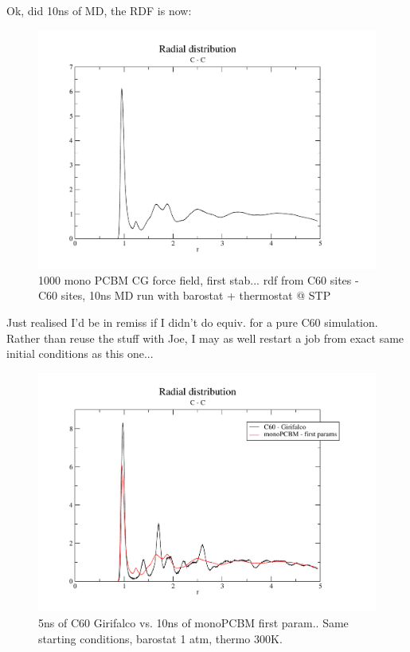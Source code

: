 \documentclass[hyperref]{labbook}
\begin{document}
Ok, did 10ns of MD, the RDF is now:

\begin{figure}[h!]
\centering
\includegraphics[width=0.8\columnwidth,angle=270]{./figs/monoPCBM-CG_1000_rdf_10ns}
\caption{\label{monoPCBM-CG_1000_rdf_10ns}
1000 mono PCBM CG force field, first stab... rdf from C60 sites - C60 sites, 10ns MD run with barostat + thermostat @ STP
}
\end{figure}

Just realised I'd be in remiss if I didn't do equiv. for a pure C60 simulation. Rather than reuse the stuff with Joe, I may as well restart a job from exact same initial conditions as this one...


\begin{figure}[h!]
\centering
\includegraphics[width=0.8\columnwidth,angle=270]{./figs/monoPCBM-CG_1000_C60_vs_mono}
\caption{\label{monoPCBM-CG_1000_C60_vs_mono}
5ns of C60 Girifalco vs. 10ns of monoPCBM first param.. Same starting conditions, barostat 1 atm, thermo 300K.
}
\end{figure}
\end{document}
